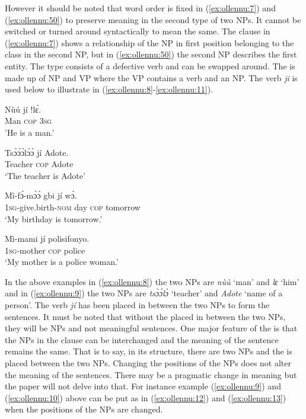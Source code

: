 \documentclass[output=paper
,newtxmath
,modfonts
,nonflat]{langsci/langscibook}
\begin{document}
However it should be noted that word order is fixed in (\ref{ex:ollennu:7}) and (\ref{ex:ollennu:50}) to preserve meaning in the second type of two NPs. It cannot be switched or turned around syntactically to mean the same. The clause in (\ref{ex:ollennu:7})
shows a relationship of the NP in first position belonging to the class in the second NP, but in (\ref{ex:ollennu:50}) the second NP describes the first entity. The  type consists of a defective verb and can be swapped around. The  is made up of NP and VP where the VP contains a  verb and an NP. The  verb \textit{ji} is used below to illustrate in (\ref{ex:ollennu:8}-\ref{ex:ollennu:11}).

\ea \label{ex:ollennu:8}
\gll N\`u\'u j\'i !l\'ɛ.\\
Man \textsc{cop} 3\textsc{sg}\\
\glt 'He is a man.'
\z

\ea \label{ex:ollennu:9}
\gll Ts\`ɔ\'ɔɔ̀l\`ɔɔ̀ j\'i Adote.\\
Teacher \textsc{cop} Adote\\
\glt 	`The teacher is Adote'
\z

\ea \label{ex:ollennu:10}
\gll M\`i-f\'ɔ-m\`ɔɔ̀ gbi j\'i w\`ɔ.\\
1\textsc{sg}-give.birth-\textsc{nom} day \textsc{cop} tomorrow\\
\glt `My birthday is tomorrow.'
\z

\ea \label{ex:ollennu:11}
\gll M\`i-mami j\'i polisifonyo.\\
1\textsc{sg}-mother \textsc{cop} police\\
\glt `My mother is a police woman.'
\z

In the above examples in (\ref{ex:ollennu:8}) the two NPs are \textit{n\`u\`u} `man' and \textit{lɛ} `him' and in (\ref{ex:ollennu:9}) the two NPs are \textit{ts\`ɔ\'ɔl\`ɔ} `teacher' and \textit{Adote} `name of a person'. The  verb \textit{j\'i} has been placed in between the two NPs to form the sentences. It must be noted that without the  placed in between the two NPs, they will be
NPs and not meaningful sentences. One major feature of the   is that the NPs in the clause can be interchanged and the meaning of the sentence remains the same. That is to say, in its structure, there are two NPs and the  is placed between the two NPs. Changing the positions of the NPs does not alter the meaning of the sentences. There may be a pragmatic change in meaning but the paper will not delve into that. For instance example (\ref{ex:ollennu:9}) and (\ref{ex:ollennu:10}) above can be put as in (\ref{ex:ollennu:12}) and (\ref{ex:ollennu:13}) when the positions of the NPs are changed.
\end{document}
